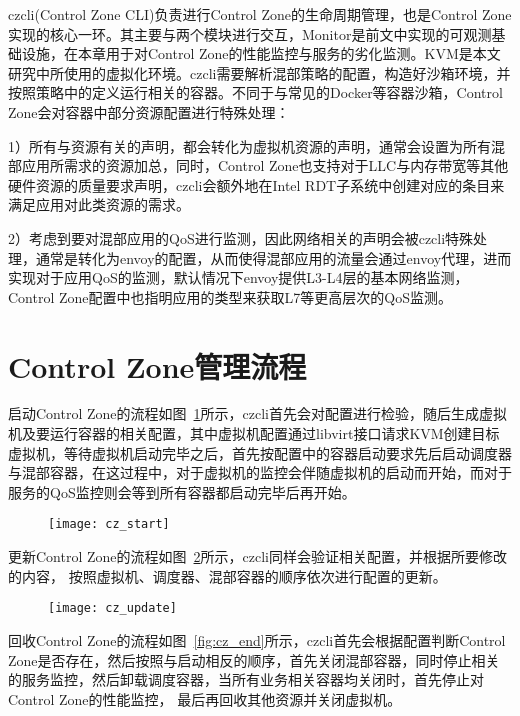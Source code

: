 czcli(Control Zone CLI)负责进行Control Zone的生命周期管理，也是Control Zone实现的核心一环。其主要与两个模块进行交互，Monitor是前文中实现的可观测基础设施，在本章用于对Control Zone的性能监控与服务的劣化监测。KVM是本文研究中所使用的虚拟化环境。czcli需要解析混部策略的配置，构造好沙箱环境，并按照策略中的定义运行相关的容器。不同于与常见的Docker等容器沙箱，Control Zone会对容器中部分资源配置进行特殊处理：

1）所有与资源有关的声明，都会转化为虚拟机资源的声明，通常会设置为所有混部应用所需求的资源加总，同时，Control Zone也支持对于LLC与内存带宽等其他硬件资源的质量要求声明，czcli会额外地在Intel RDT子系统中创建对应的条目来满足应用对此类资源的需求。

2）考虑到要对混部应用的QoS进行监测，因此网络相关的声明会被czcli特殊处理，通常是转化为envoy的配置，从而使得混部应用的流量会通过envoy代理，进而实现对于应用QoS的监测，默认情况下envoy提供L3-L4层的基本网络监测，Control Zone配置中也指明应用的类型来获取L7等更高层次的QoS监测。

\section{Control Zone管理流程}

启动Control Zone的流程如图~\ref{fig:cz_start}所示，czcli首先会对配置进行检验，随后生成虚拟机及要运行容器的相关配置，其中虚拟机配置通过libvirt接口请求KVM创建目标虚拟机，等待虚拟机启动完毕之后，首先按配置中的容器启动要求先后启动调度器与混部容器，在这过程中，对于虚拟机的监控会伴随虚拟机的启动而开始，而对于服务的QoS监控则会等到所有容器都启动完毕后再开始。

\begin{figure}[!htbp]
    \centering
    \texttt{[image: cz\_start]}
    \label{fig:cz_start}
\end{figure}

更新Control Zone的流程如图~\ref{fig:cz_update}所示，czcli同样会验证相关配置，并根据所要修改的内容， 按照虚拟机、调度器、混部容器的顺序依次进行配置的更新。

\begin{figure}[!htbp]
    \centering
    \texttt{[image: cz\_update]}
    \label{fig:cz_update}
\end{figure}

回收Control Zone的流程如图~\ref{fig:cz_end}所示，czcli首先会根据配置判断Control Zone是否存在，然后按照与启动相反的顺序，首先关闭混部容器，同时停止相关的服务监控，然后卸载调度容器，当所有业务相关容器均关闭时，首先停止对Control Zone的性能监控， 最后再回收其他资源并关闭虚拟机。

